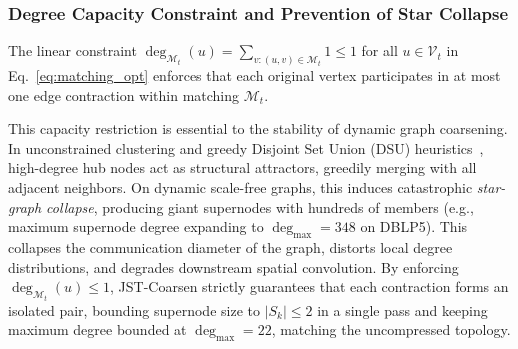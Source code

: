 \documentclass[sigconf]{acmart}
\begin{document}
\subsubsection{Degree Capacity Constraint and Prevention of Star Collapse}
The linear constraint $\operatorname{deg}_{\mathcal{M}_t}(u) = \sum_{v : (u, v) \in \mathcal{M}_t} 1 \le 1$ for all $u \in \mathcal{V}_t$ in Eq.~\eqref{eq:matching_opt} enforces that each original vertex participates in at most one edge contraction within matching $\mathcal{M}_t$. 

This capacity restriction is essential to the stability of dynamic graph coarsening. In unconstrained clustering and greedy Disjoint Set Union (DSU) heuristics~\cite{sacod2026}, high-degree hub nodes act as structural attractors, greedily merging with all adjacent neighbors. On dynamic scale-free graphs, this induces catastrophic \textit{star-graph collapse}, producing giant supernodes with hundreds of members (e.g., maximum supernode degree expanding to $\operatorname{deg}_{\max} = 348$ on DBLP5). This collapses the communication diameter of the graph, distorts local degree distributions, and degrades downstream spatial convolution. By enforcing $\operatorname{deg}_{\mathcal{M}_t}(u) \le 1$, JST-Coarsen strictly guarantees that each contraction forms an isolated pair, bounding supernode size to $|S_k| \le 2$ in a single pass and keeping maximum degree bounded at $\operatorname{deg}_{\max} = 22$, matching the uncompressed topology.
\end{document}
